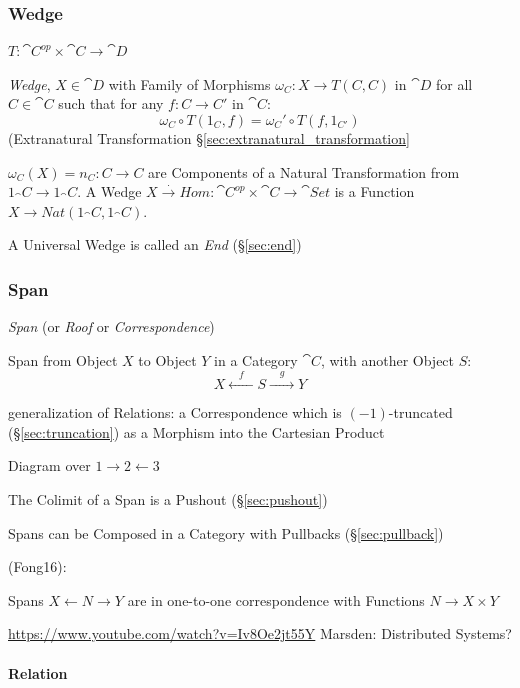 \subsubsection{Wedge}\label{sec:wedge}

$T : \cat{C}^{op} \times \cat{C} \rightarrow \cat{D}$

\emph{Wedge}, $X \in \cat{D}$ with Family of Morphisms $\omega_C : X \rightarrow
T(C,C)$ in $\cat{D}$ for all $C \in \cat{C}$ such that for any $f : C
\rightarrow C'$ in $\cat{C}$:
\[
  \omega_C \circ T(1_C,f) = \omega_C' \circ T(f,1_{C'})
\]
(Extranatural Transformation \S\ref{sec:extranatural_transformation}

$\omega_C(X) = n_C : C \rightarrow C$ are Components of a Natural Transformation
from $1_\cat{C} \rightarrow 1_\cat{C}$. A Wedge $X \xrightarrow{.} Hom :
\cat{C}^{op} \times \cat{C} \rightarrow \cat{Set}$ is a Function $X \rightarrow
Nat (1_\cat{C},1_\cat{C})$.

A Universal Wedge is called an \emph{End} (\S\ref{sec:end})



\subsubsection{Span}\label{sec:span}

\emph{Span} (or \emph{Roof} or \emph{Correspondence})

Span from Object $X$ to Object $Y$ in a Category $\cat{C}$, with
another Object $S$:
\[
  X \xleftarrow{\quad f \quad} S \xrightarrow{\quad g \quad} Y
\]

generalization of Relations: a Correspondence which is
$(-1)$-truncated (\S\ref{sec:truncation}) as a Morphism into the
Cartesian Product

Diagram over $1 \rightarrow 2 \leftarrow 3$

The Colimit of a Span is a Pushout (\S\ref{sec:pushout})

Spans can be Composed in a Category with Pullbacks
(\S\ref{sec:pullback})

(Fong16):

Spans $X \leftarrow N \rightarrow Y$ are in one-to-one correspondence
with Functions $N \rightarrow X \times Y$

\url{https://www.youtube.com/watch?v=Iv8Oe2jt55Y} Marsden: Distributed
Systems? %



\paragraph{Relation}\label{sec:relation}\hfill

